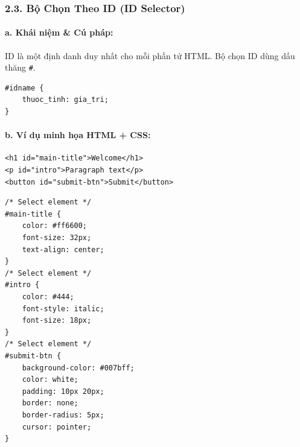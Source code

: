 \documentclass[11pt,oneside]{book}
\newcommand{\thd}[1]{\textcolor{white}{\textbf{\strut #1}}}
\newcommand{\codeinline}[1]{\textcolor{accentOrange}{\texttt{#1}}}
\begin{document}
\begin{prettyTableBox}
\sffamily\small
{}
\end{prettyTableBox}

\subsubsection{2.3. Bộ Chọn Theo ID (ID Selector)}

\paragraph{a. Khái niệm \& Cú pháp:}
ID là một định danh duy nhất cho mỗi phần tử HTML. Bộ chọn ID dùng dấu thăng \codeinline{\#}.
\begin{codeWindow}
\begin{lstlisting}[language=CSS3]
#idname {
    thuoc_tinh: gia_tri;
}
\end{lstlisting}
\end{codeWindow}

\paragraph{b. Ví dụ minh họa HTML + CSS:}
\begin{codeWindow}
\begin{lstlisting}[language=HTML5]
<h1 id="main-title">Welcome</h1>
<p id="intro">Paragraph text</p>
<button id="submit-btn">Submit</button>
\end{lstlisting}

\begin{lstlisting}[language=CSS3]
/* Select element */
#main-title {
    color: #ff6600;
    font-size: 32px;
    text-align: center;
}
/* Select element */
#intro {
    color: #444;
    font-style: italic;
    font-size: 18px;
}
/* Select element */
#submit-btn {
    background-color: #007bff;
    color: white;
    padding: 10px 20px;
    border: none;
    border-radius: 5px;
    cursor: pointer;
}
\end{lstlisting}
\end{codeWindow}
\end{document}
